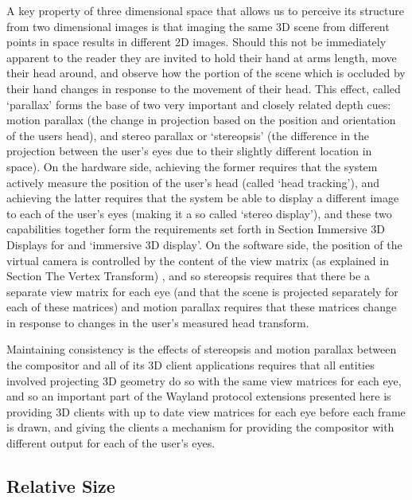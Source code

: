 A key property of three dimensional space that allows us to perceive its structure from two dimensional images is that imaging the same 3D scene from different points in space results in different 2D images. Should this not be immediately apparent to the reader they are invited to hold their hand at arms length, move their head around, and observe how the portion of the scene which is occluded by their hand changes in response to the movement of their head. This effect, called ‘parallax’ forms the base of two very important and closely related depth cues: motion parallax (the change in projection based on the position and orientation of the users head), and stereo parallax or ‘stereopsis’ (the difference in the projection between the user’s eyes due to their slightly different location in space). On the hardware side, achieving the former requires that the system actively measure the position of the user’s head (called ‘head tracking’), and achieving the latter requires that the system be able to display a different image to each of the user’s eyes (making it a so called ‘stereo display’), and these two capabilities together form the requirements set forth in Section {Immersive 3D Displays} for and ‘immersive 3D display’. On the software side, the position of the virtual camera is controlled by the content of the view matrix (as explained in Section {The Vertex Transform}) , and so stereopsis requires that there be a separate view matrix for each eye (and that the scene is projected separately for each of these matrices) and motion parallax requires that these matrices change in response to changes in the user’s measured head transform.

Maintaining consistency is the effects of stereopsis and motion parallax between the compositor and all of its 3D client applications requires that all entities involved projecting 3D geometry do so with the same view matrices for each eye, and so an important part of the Wayland protocol extensions presented here is providing 3D clients with up to date view matrices for each eye before each frame is drawn, and giving the clients a mechanism for providing the compositor with different output for each of the user’s eyes.

\subsection{Relative Size}

